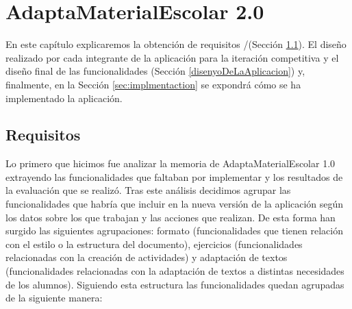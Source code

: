 \chapter{AdaptaMaterialEscolar 2.0}
\label{cap:AdaptaMaterialEscolar2.0}
En este capítulo explicaremos la obtención de requisitos /(Sección \ref{cap:requisitos}). El diseño realizado por cada integrante de la aplicación para la iteración competitiva y el diseño final de las funcionalidades (Sección \ref{disenyoDeLaAplicacion}) y, finalmente, en la Sección \ref{sec:implmentaction} se expondrá cómo se ha implementado la aplicación.

\section{Requisitos}
\label{cap:requisitos}

Lo primero que hicimos fue analizar la memoria de AdaptaMaterialEscolar 1.0 \citep*{AdaptaMaterialEscolar1.0} extrayendo las funcionalidades que faltaban por implementar y los resultados de la evaluación que se realizó. Tras este análisis decidimos agrupar las funcionalidades que habría que incluir en la nueva versión de la aplicación según los datos sobre los que trabajan y las acciones que realizan. De esta forma han surgido las siguientes agrupaciones: formato (funcionalidades que tienen relación con el estilo o la estructura del documento), ejercicios (funcionalidades relacionadas con la creación de actividades) y adaptación de textos (funcionalidades relacionadas con la adaptación de textos a distintas necesidades de los alumnos). Siguiendo esta estructura las funcionalidades quedan agrupadas de la siguiente manera:


